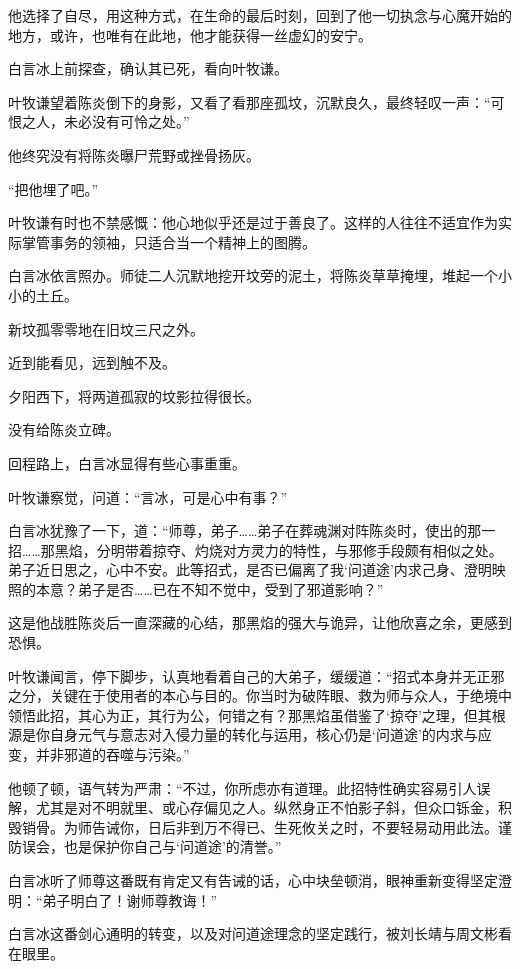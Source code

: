 他选择了自尽，用这种方式，在生命的最后时刻，回到了他一切执念与心魔开始的地方，或许，也唯有在此地，他才能获得一丝虚幻的安宁。

白言冰上前探查，确认其已死，看向叶牧谦。

叶牧谦望着陈炎倒下的身影，又看了看那座孤坟，沉默良久，最终轻叹一声：“可恨之人，未必没有可怜之处。”

他终究没有将陈炎曝尸荒野或挫骨扬灰。

“把他埋了吧。”

叶牧谦有时也不禁感慨：他心地似乎还是过于善良了。这样的人往往不适宜作为实际掌管事务的领袖，只适合当一个精神上的图腾。

白言冰依言照办。师徒二人沉默地挖开坟旁的泥土，将陈炎草草掩埋，堆起一个小小的土丘。

新坟孤零零地在旧坟三尺之外。

近到能看见，远到触不及。

夕阳西下，将两道孤寂的坟影拉得很长。

没有给陈炎立碑。

\vspace{2em}

回程路上，白言冰显得有些心事重重。

叶牧谦察觉，问道：“言冰，可是心中有事？”

白言冰犹豫了一下，道：“师尊，弟子……弟子在葬魂渊对阵陈炎时，使出的那一招……那黑焰，分明带着掠夺、灼烧对方灵力的特性，与邪修手段颇有相似之处。弟子近日思之，心中不安。此等招式，是否已偏离了我‘问道途’内求己身、澄明映照的本意？弟子是否……已在不知不觉中，受到了邪道影响？”

这是他战胜陈炎后一直深藏的心结，那黑焰的强大与诡异，让他欣喜之余，更感到恐惧。

叶牧谦闻言，停下脚步，认真地看着自己的大弟子，缓缓道：“招式本身并无正邪之分，关键在于使用者的本心与目的。你当时为破阵眼、救为师与众人，于绝境中领悟此招，其心为正，其行为公，何错之有？那黑焰虽借鉴了‘掠夺’之理，但其根源是你自身元气与意志对入侵力量的转化与运用，核心仍是‘问道途’的内求与应变，并非邪道的吞噬与污染。”

他顿了顿，语气转为严肃：“不过，你所虑亦有道理。此招特性确实容易引人误解，尤其是对不明就里、或心存偏见之人。纵然身正不怕影子斜，但众口铄金，积毁销骨。为师告诫你，日后非到万不得已、生死攸关之时，不要轻易动用此法。谨防误会，也是保护你自己与‘问道途’的清誉。”

白言冰听了师尊这番既有肯定又有告诫的话，心中块垒顿消，眼神重新变得坚定澄明：“弟子明白了！谢师尊教诲！”

白言冰这番剑心通明的转变，以及对问道途理念的坚定践行，被刘长靖与周文彬看在眼里。

